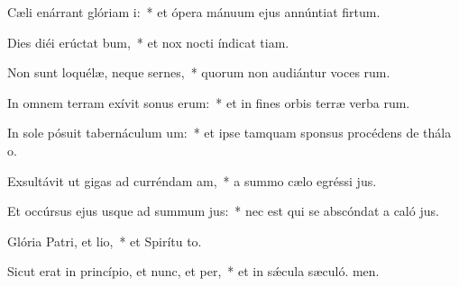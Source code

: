 \item Cæli enárrant glóriam i:~* et ópera mánuum ejus annúntiat firtum.
\item Dies diéi erúctat bum,~* et nox nocti índicat tiam.
\item Non sunt loquélæ, neque sernes,~* quorum non audiántur voces rum.
\item In omnem terram exívit sonus erum:~* et in fines orbis terræ verba rum.
\item In sole pósuit tabernáculum um:~* et ipse tamquam sponsus procédens de thála o.
\item Exsultávit ut gigas ad curréndam am,~* a summo cælo egréssi jus.
\item Et occúrsus ejus usque ad summum jus:~* nec est qui se abscóndat a caló jus.
\item Glória Patri, et lio,~* et Spirítu to.
\item Sicut erat in princípio, et nunc, et per,~* et in sǽcula sæculó. men.
